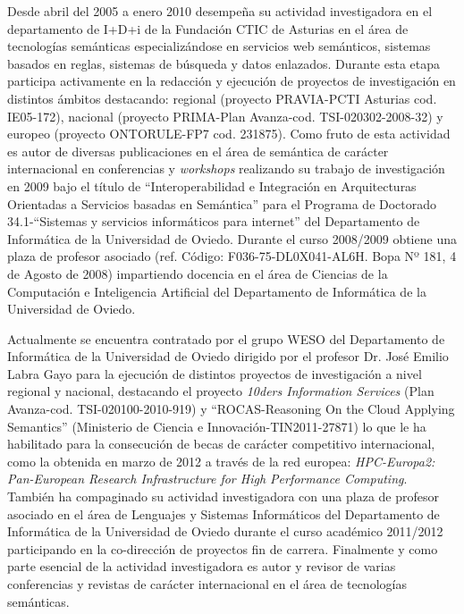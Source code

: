 Desde abril del 2005 a enero 2010 desempeña su actividad investigadora en el departamento de I+D+i de la Fundación CTIC de Asturias 
en el área de tecnologías semánticas especializándose en servicios web semánticos, sistemas basados en reglas, sistemas de búsqueda y 
datos enlazados. Durante esta etapa participa activamente en la redacción y ejecución de proyectos de investigación en distintos ámbitos 
destacando: regional (proyecto PRAVIA-PCTI Asturias cod. IE05-172), nacional (proyecto PRIMA-Plan Avanza-cod. TSI-020302-2008-32) y 
europeo (proyecto ONTORULE-FP7 cod. 231875). Como fruto de esta actividad es autor de diversas publicaciones en el área de semántica 
de carácter internacional en conferencias y \textit{workshops} realizando su trabajo de investigación en 2009 bajo 
el título de ``Interoperabilidad e Integración en Arquitecturas Orientadas a Servicios basadas en Semántica'' para el Programa de 
Doctorado 34.1-``Sistemas y servicios informáticos para internet'' del Departamento de Informática de la Universidad de Oviedo. Durante el curso 2008/2009 obtiene una plaza de profesor asociado (ref. Código: F036-75-DL0X041-AL6H. Bopa Nº 181, 4 de Agosto de 2008) 
impartiendo docencia en el área de Ciencias de la Computación e Inteligencia Artificial del Departamento de Informática de la Universidad de Oviedo. 


Actualmente se encuentra contratado por el grupo WESO del Departamento de Informática de la Universidad de Oviedo dirigido por 
el profesor Dr. José Emilio Labra Gayo para la ejecución de distintos proyectos de investigación a nivel regional y nacional, destacando  
el proyecto \textit{10ders Information Services} (Plan Avanza-cod. TSI-020100-2010-919) y ``ROCAS-Reasoning On the Cloud Applying Semantics'' 
(Ministerio de Ciencia e Innovación-TIN2011-27871) lo que le ha habilitado para la consecución de becas de carácter competitivo internacional, 
como la obtenida en marzo de 2012 a través de la red europea: \textit{HPC-Europa2: Pan-European Research Infrastructure for High Performance Computing}.
 También ha compaginado su actividad investigadora con una plaza de profesor asociado en el área de Lenguajes y Sistemas Informáticos del Departamento de Informática de la Universidad de Oviedo durante el curso académico 
2011/2012 participando en la co-dirección de proyectos fin de carrera. Finalmente y como parte esencial de la actividad investigadora 
es autor y revisor de varias conferencias y revistas de carácter internacional en el área de tecnologías semánticas.



